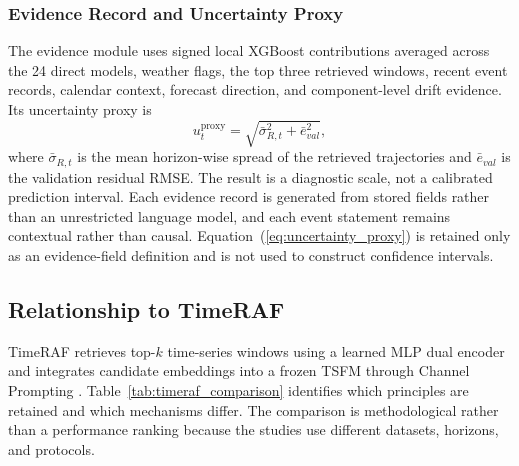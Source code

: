 \documentclass{ieeeaccess}
\begin{document}
\subsubsection{Evidence Record and Uncertainty Proxy}
The evidence module uses signed local XGBoost contributions averaged across
the 24 direct models, weather flags, the top three retrieved windows, recent
event records, calendar context, forecast direction, and component-level drift
evidence. Its uncertainty proxy is
\begin{equation}
u_t^{\mathrm{proxy}}=
\sqrt{\bar{\sigma}_{R,t}^{2}+\bar{e}_{val}^{2}},
\label{eq:uncertainty_proxy}
\end{equation}
where $\bar{\sigma}_{R,t}$ is the mean horizon-wise spread of the retrieved
trajectories and $\bar{e}_{val}$ is the validation residual RMSE. The
result is a diagnostic scale, not a calibrated prediction interval. Each
evidence record is generated from stored fields rather than an unrestricted
language model, and each event statement remains contextual rather than causal.
Equation~(\ref{eq:uncertainty_proxy}) is retained only as an evidence-field
definition and is not used to construct confidence intervals.

\subsection{Relationship to TimeRAF}
TimeRAF retrieves top-$k$ time-series windows using a learned MLP dual encoder
and integrates candidate embeddings into a frozen TSFM through Channel
Prompting \cite{zhang2025timeraf}. Table~\ref{tab:timeraf_comparison} identifies
which principles are retained and which mechanisms differ. The comparison is
methodological rather than a performance ranking because the studies use
different datasets, horizons, and protocols.
\end{document}
